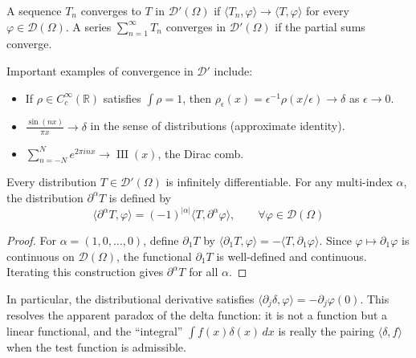 \begin{definition}
A sequence $T_n$ converges to $T$ in $\mathcal{D}'(\Omega)$ if $\langle T_n, \varphi \rangle \to \langle T, \varphi \rangle$ for every $\varphi \in \mathcal{D}(\Omega)$. A series $\sum_{n=1}^\infty T_n$ converges in $\mathcal{D}'(\Omega)$ if the partial sums converge.
\end{definition}

\begin{example}
Important examples of convergence in $\mathcal{D}'$ include:
\begin{itemize}
\item If $\rho\in C_c^\infty(\mathbb{R})$ satisfies $\int\rho=1$, then $\rho_\epsilon(x)=\epsilon^{-1}\rho(x/\epsilon)\to\delta$ as $\epsilon\to0$.
\item $\frac{\sin(nx)}{\pi x} \to \delta$ in the sense of distributions (approximate identity).
\item $\sum_{n=-N}^N e^{2\pi i n x} \to \operatorname{III}(x)$, the Dirac comb.
\end{itemize}
\end{example}

\begin{theorem}\label{thm:distributions_differential}
Every distribution $T \in \mathcal{D}'(\Omega)$ is infinitely differentiable. For any multi-index $\alpha$, the distribution $\partial^\alpha T$ is defined by
\[\langle \partial^\alpha T, \varphi \rangle = (-1)^{|\alpha|} \langle T, \partial^\alpha \varphi \rangle, \qquad \forall \varphi \in \mathcal{D}(\Omega)\]
\end{theorem}

\begin{proof}
For $\alpha = (1,0,\ldots,0)$, define $\partial_1 T$ by $\langle \partial_1 T, \varphi \rangle = -\langle T, \partial_1 \varphi \rangle$. Since $\varphi \mapsto \partial_1 \varphi$ is continuous on $\mathcal{D}(\Omega)$, the functional $\partial_1 T$ is well-defined and continuous. Iterating this construction gives $\partial^\alpha T$ for all $\alpha$.
\end{proof}

In particular, the distributional derivative satisfies
$\langle \partial_j\delta,\varphi\rangle=-\partial_j\varphi(0)$.
This resolves the apparent paradox of the delta function: it is not a
function but a linear functional, and the ``integral'' $\int f(x)\delta(x) \, dx$
is really the pairing $\langle \delta, f \rangle$ when the test function is
admissible.

